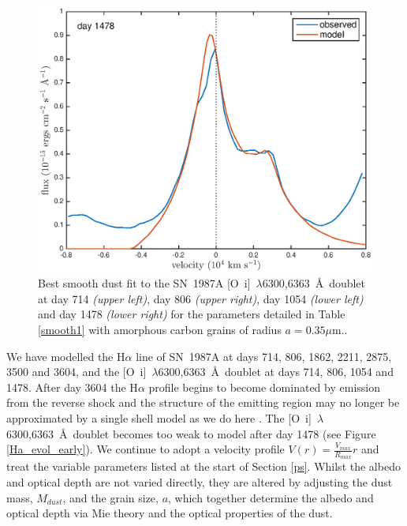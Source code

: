 \documentclass[useAMS,usenatbib,usegraphicx]{mnras}
\begin{document}
\begin{figure}
\begin{center}
\includegraphics[trim =33 10 45 15,clip=true,scale=0.41]{smooth/best_fit/d1478OI}
\caption{Best smooth dust fit to the SN~1987A [O~{\sc i}]~$\lambda$6300,6363~\AA\ doublet at day 714 \textit{(upper left)}, day 806 \textit{(upper right)}, day 1054 \textit{(lower left)} and day 1478 \textit{(lower right)} for the parameters detailed in Table \ref{smooth1} with amorphous carbon grains of radius $a=0.35 \mu$m..}
\label{OI_smooth}
\end{center}
\end{figure}


We have  modelled the H$\alpha$ line of SN~1987A at days 714, 806, 1862, 2211, 2875, 3500 and 3604, and the 
[O~{\sc i}]~$\lambda$6300,6363~\AA\ doublet at days 714, 806, 1054 and 1478.  After day 3604 the H$\alpha$ profile begins to become dominated by emission from the reverse shock 
and the structure of the emitting region may no longer be approximated by 
a single shell model as we do here \citep{Fransson2013}.  The [O~{\sc i}]~$\lambda$6300,6363~\AA\ doublet becomes too weak to model after day 1478  (see Figure \ref{Ha_evol_early}).  We continue to adopt a velocity profile $V(r) = 
\frac{V_{max}}{R_{max}}r$ and treat the variable parameters listed at the start of 
Section \ref{ps}.  Whilst the albedo and optical depth are not varied 
directly, they are altered by adjusting the dust mass, $M_{dust}$, and the 
grain size, $a$, which together determine the albedo and optical 
depth via  Mie theory and the optical properties of the 
dust.
\end{document}

